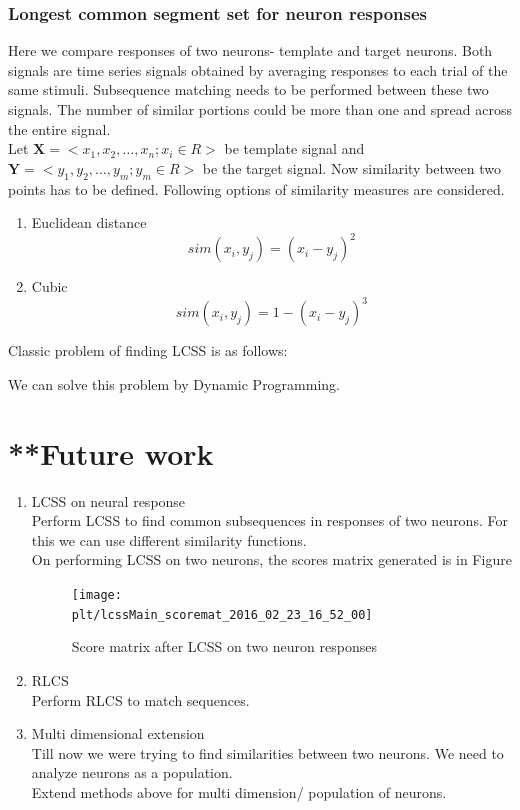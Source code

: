 \documentclass[11pt,paper=a4,answers]{exam}
\newcommand{\plt}{../../plots}
\begin{document}
\subsubsection{Longest common segment set for neuron responses} %
\label{ssub:longest_common_segment_set_for_neuron_responses}
Here we compare responses of two neurons- template and target neurons. Both signals are time series signals obtained by averaging responses to each trial of the same stimuli. Subsequence matching needs to be performed
between these two signals. The number of similar portions could be more than one and spread across the entire signal.\\
Let $\bm{X} = < x_1, x_2,\hdots, x_n ; x_i \in R >$ be template signal and $\bm{Y} = <y_1, y_2, \hdots, y_m ; y_m \in R>$ be the target signal. Now similarity between two points has to be defined. Following options of similarity measures are considered.
\begin{enumerate}
    \item Euclidean distance\\
    $$sim(x_i, y_j) =  (x_i - y_j)^2$$
    \item Cubic\\
    $$sim(x_i, y_j) =  1 - (x_i - y_j)^3$$
\end{enumerate}
Classic problem of finding LCSS is as follows:

We can solve this problem by Dynamic Programming.
\newpage
\section{**Future work}
\begin{enumerate}
    \item LCSS on neural response\\
    Perform LCSS to find common subsequences in responses of two neurons. For this we can use different similarity functions.\\
    On performing LCSS on two neurons, the scores matrix generated is in Figure
    \begin{figure}
        \centering
        \texttt{[image: \\plt/lcssMain\_scoremat\_2016\_02\_23\_16\_52\_00]}
        \caption{Score matrix after LCSS on two neuron responses}
    \end{figure}
    \item RLCS\\
    Perform RLCS to match sequences.
    \item Multi dimensional extension\\
    Till now we were trying to find similarities between two neurons. We need to analyze neurons as a population.\\
    Extend methods above for multi dimension/ population of neurons.
\end{enumerate}
\end{document}
